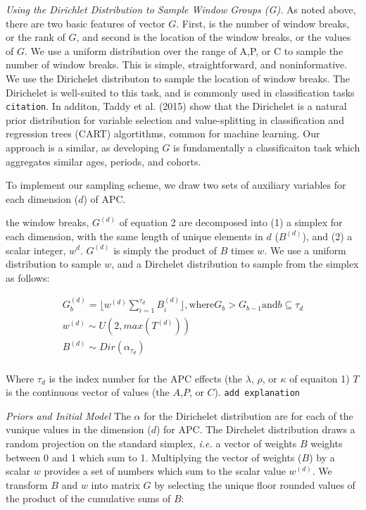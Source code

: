 \documentclass[]{article}
\begin{document}
\emph{Using the Dirichlet Distribution to Sample Window Groups (G).} As
noted above, there are two basic features of vector \(G\). First, is the
number of window breaks, or the rank of \(G\), and second is the
location of the window breaks, or the values of \(G\). We use a uniform
distribution over the range of A,P, or C to sample the number of window
breaks. This is simple, straightforward, and noninformative. We use the
Dirichelet distributon to sample the location of window breaks. The
Dirichelet is well-suited to this task, and is commonly used in
classification tasks \texttt{citation}. In additon, Taddy et al. (2015)
show that the Dirichelet is a natural prior distribution for variable
selection and value-splitting in classification and regression trees
(CART) algortithms, common for machine learning. Our approach is a
similar, as developing \(G\) is fundamentally a classificaiton task
which aggregates similar ages, periods, and cohorts.

To implement our sampling scheme, we draw two sets of auxiliary
variables for each dimension (\(d\)) of APC.

the window breaks, \(G^{(d)}\) of equation 2 are decomposed into (1) a
simplex for each dimension, with the same length of unique elements in
\(d\) (\(B^{(d)}\)), and (2) a scalar integer, \(w^d\). \(G^{(d)}\) is
simply the product of \(B\) times \(w\). We use a uniform distribution
to sample \(w\), and a Dirchelet distribution to sample from the simplex
as follows:

\[
\begin{matrix}
G^{(d)}_b = \Bigg \lfloor w^{(d)} \sum_{i=1}^{\tau_d} B^{(d)}_i \Bigg \rfloor,
      \mbox{where} G_b > G_{b-1} \mbox{and} b \subseteq \tau_d   \\
w^{(d)} \sim U(2,max(T^{(d)}))  \\
B^{(d)} \sim Dir(\alpha_{\tau_d}) \\
\end{matrix}
\]

Where \(\tau_{d}\) is the index number for the APC effects (the
\(\lambda\), \(\rho\), or \(\kappa\) of equaiton 1) \(T\) is the
continuous vector of values (the \(A\),\(P\), or \(C\)).
\texttt{add\ explanation}

\emph{Priors and Initial Model} The \(\alpha\) for the Dirichelet
distribution are for each of the vunique values in the dimension (\(d\))
for APC. The Dirchelet distribution draws a random projection on the
standard simplex, \emph{i.e.} a vector of weights \(B\) weights between
0 and 1 which sum to 1. Multiplying the vector of weights (\(B\)) by a
scalar \(w\) provides a set of numbers which sum to the scalar value
\(w^{(d)}\). We transform \(B\) and \(w\) into matrix \(G\) by selecting
the unique floor rounded values of the product of the cumulative sums of
\(B\):
\end{document}
